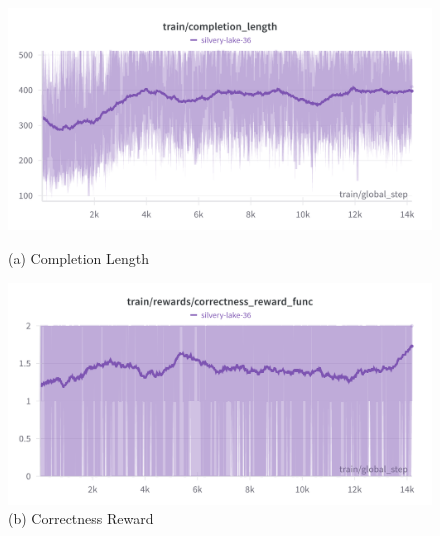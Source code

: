 \documentclass[11pt]{article}
\begin{document}
\begin{itemize}
\begin{figure}[htbp]
    \begin{minipage}{\graphwidthtwo}
        \centering
        \includegraphics[width=\linewidth]{phi/completoin_length.png} %
        \caption*{(a) Completion Length}
    \end{minipage}\hfill
    \begin{minipage}{\graphwidthtwo}
        \centering
        \includegraphics[width=\linewidth]{phi/correctness_reward.png} %
        \caption*{(b) Correctness Reward}
    \end{minipage}

    \vspace{1em} %


\end{figure}
\end{itemize}
\end{document}
